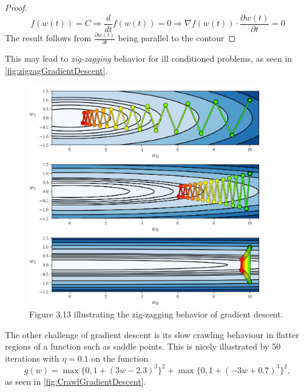 \documentclass{article}
\theoremstyle{definition}
\begin{document}
\begin{proof}
$$f(w(t)) = C \Rightarrow \frac{d}{dt} f(w(t)) = 0 \Rightarrow \nabla f(w(t)) \cdot \frac{\partial w(t)}{\partial t} = 0$$
The result follows from $\frac{\partial w(t)}{\partial t}$ being parallel to the contour
\end{proof}

This may lead to \textit{zig-zagging} behavior for ill conditioned problems, as seen in \autoref{fig:zigzagGradientDescent}.

\begin{figure}[H]
    \centering
    \includegraphics[width=0.9\textwidth]{Project2/figures/Gradient_descent_zigzag.jpeg}
    \caption{Figure 3.13 \parencite[p.~68]{MLRefined} illustrating the zig-zagging behavior
of gradient descent.}
    \label{fig:zigzagGradientDescent}
\end{figure}

The other challenge of gradient descent is its slow crawling behaviour in flatter regions of a function such as saddle points. This is nicely illustrated by 50 iterations with $\eta = 0.1$ on the function 
\begin{equation*}
    g(w) =  \max\{0, 1 + (3w - 2.3)^3\}^2 + \max\{0, 1 + (-3w + 0.7)^3\}^2,
\end{equation*}
as seen in \autoref{fig:CrawlGradientDescent}.
\end{document}
